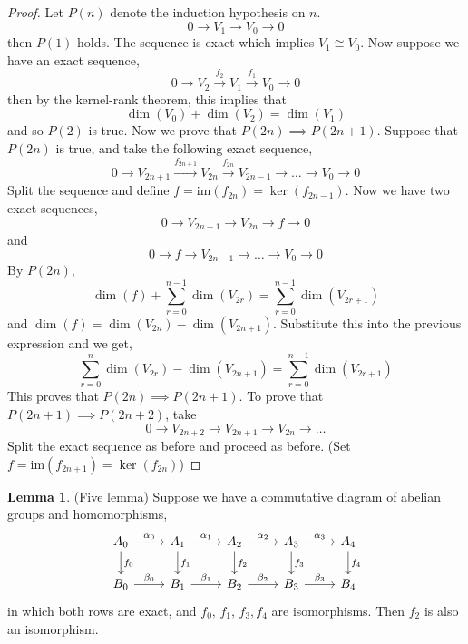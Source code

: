 \documentclass[a4paper,14pt]{extarticle}
\theoremstyle{definition}
\newtheorem*{lemma}{Lemma}
\begin{document}
\begin{proof}
	Let $P(n)$ denote the induction hypothesis on $n$.
	\[0\rightarrow V_1\rightarrow V_0\rightarrow 0\]
	then $P(1)$ holds. The sequence is exact which implies $V_1\cong V_0$.
	Now suppose we have an exact sequence,
	\[0\rightarrow V_2\xrightarrow{f_2}V_1\xrightarrow{f_1}V_0\rightarrow 0\]
	then by the kernel-rank theorem, this implies that
	\[\dim(V_0)+\dim(V_2)=\dim(V_1)\] and so $P(2)$ is true. Now we prove
	that $P(2n)\implies P(2n+1)$. Suppose that $P(2n)$ is true, and take
	the following exact sequence,
	\[0\rightarrow V_{2n+1}\xrightarrow{f_{2n+1}}V_{2n}\xrightarrow{f_{2n}}
	V_{2n-1}\rightarrow\ldots\rightarrow V_0\rightarrow 0\] Split the sequence and define $f=\text{im}(f_{2n})=\ker(f_{2n-1})$. Now we have two exact sequences,
	\[0\rightarrow V_{2n+1}\rightarrow V_{2n}\rightarrow f\rightarrow 0\]
	and \[0\rightarrow f\rightarrow V_{2n-1}\rightarrow\ldots\rightarrow V_0
	\rightarrow 0\] By $P(2n)$, \[\dim(f)+\sum_{r=0}^{n-1}\dim(V_{2r})=
	\sum_{r=0}^{n-1}\dim(V_{2r+1})\] and $\dim(f)=\dim(V_{2n})-\dim(V_{2n+1})$.
	Substitute this into the previous expression and we get,
	\[\sum_{r=0}^n\dim(V_{2r})-\dim(V_{2n+1})=\sum_{r=0}^{n-1}\dim(V_{2r+1})\]
	This proves that $P(2n)\implies P(2n+1)$. To prove that
	$P(2n+1)\implies P(2n+2)$, take
	\[0\rightarrow V_{2n+2}\rightarrow V_{2n+1}\rightarrow
	V_{2n}\rightarrow\ldots\] Split the exact sequence as before and
	proceed as before. (Set $f=\text{im}(f_{2n+1})=\ker(f_{2n})$)
\end{proof}

\begin{lemma}{(Five lemma)}
	Suppose we have a commutative diagram of abelian groups and homomorphisms,
	\[
	\begin{tikzcd}
		A_0\arrow{r}{\alpha_0} \arrow{d}{f_0} & A_1 \arrow{r}{\alpha_1}
		\arrow{d}{f_1} & A_2 \arrow{r}{\alpha_2} \arrow{d}{f_2} &
		A_3 \arrow{r}{\alpha_3} \arrow{d}{f_3} & A_4 \arrow{d}{f_4} \\
		B_0 \arrow{r}{\beta_0} & B_1 \arrow{r}{\beta_1} & B_2 \arrow{r}{\beta_2}
		& B_3 \arrow{r}{\beta_3} & B_4
	\end{tikzcd}
	\]
	in which both rows are exact, and $f_0, \,f_1, \,f_3, f_4$ are
	isomorphisms. Then $f_2$ is also an isomorphism.
\end{lemma}
\end{document}
